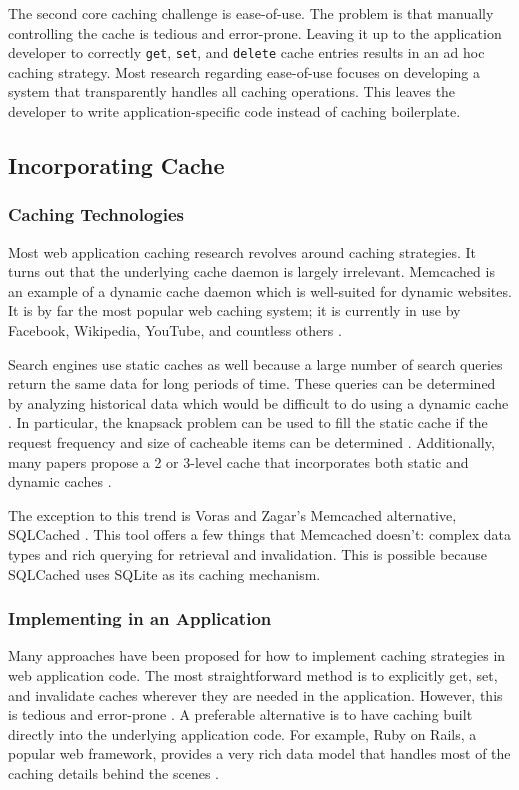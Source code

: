 \documentclass[12pt]{ucthesis}
\begin{document}
The second core caching challenge is ease-of-use.
The problem is that manually controlling the cache is tedious and error-prone.
Leaving it up to the application developer to correctly {\tt get}, {\tt set}, and {\tt delete} cache entries results in an ad hoc caching strategy.
Most research regarding ease-of-use focuses on developing a system that transparently handles all caching operations.
This leaves the developer to write application-specific code instead of caching boilerplate.

\subsection{Incorporating Cache}
\subsubsection{Caching Technologies}
Most web application caching research revolves around caching strategies.
It turns out that the underlying cache daemon is largely irrelevant.
\textsf{Memcached} is an example of a dynamic cache daemon which is well-suited for dynamic websites.
It is by far the most popular web caching system; it is currently in use by \textsf{Facebook}, \textsf{Wikipedia}, \textsf{YouTube}, and countless others \cite{memcachedDotOrg}.

Search engines use static caches as well because a large number of search queries return the same data for long periods of time.
These queries can be determined by analyzing historical data which would be difficult to do using a dynamic cache \cite{designTradeOffsSearchEngine}.
In particular, the knapsack problem can be used to fill the static cache if the request frequency and size of cacheable items can be determined \cite{designTradeOffsSearchEngine}.
Additionally, many papers propose a 2 or 3-level cache that incorporates both static and dynamic caches \cite{cacheAdmissionPolicies, designTradeOffsSearchEngine}.

The exception to this trend is Voras and Zagar's \textsf{Memcached} alternative, SQLCached \cite{sqlCached}.
This tool offers a few things that \textsf{Memcached} doesn't: complex data types and rich querying for retrieval and invalidation.
This is possible because SQLCached uses SQLite as its caching mechanism.

\subsubsection{Implementing in an Application}
Many approaches have been proposed for how to implement caching strategies in web application code.
The most straightforward method is to explicitly get, set, and invalidate caches wherever they are needed in the application.
However, this is tedious and error-prone \cite{keyBasedCacheExpiration, triggerBasedORM}.
A preferable alternative is to have caching built directly into the underlying application code.
For example, Ruby on Rails, a popular web framework, provides a very rich data model that handles most of the caching details behind the scenes \cite{keyBasedCacheExpiration}.
\end{document}

